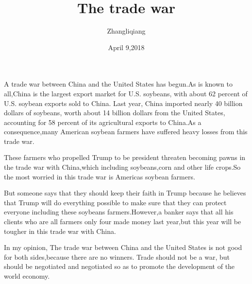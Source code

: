 \documentclass{article}
\author{Zhangliqiang}
\date{April 9,2018}
\title{The trade war}
\begin{document}
\maketitle

A trade war between China and the United States has begun.As is known to all,China is the largest export market for U.S. soybeans, with about 62 percent of U.S. soybean exports sold to China. Last year, China imported nearly 40 billion dollars of soybeans, worth about 14 billion dollars from the United States, accounting for 58 percent of its agricultural exports to China.As a consequence,many American soybean farmers have suffered heavy losses from this trade war.

These farmers who propelled Trump to be president threaten becoming pawns in the trade war with China,which including soybeans,corn and other life crops.So the most worried in this trade war is Americas soybean farmers.

But someone says that they should keep their faith in Trump because he believes that Trump will do everything possible to make sure that they can protect everyone including these soybeans farmers.However,a banker says that all his clients who are all farmers only four made money last year,but this year will be tougher in this trade war with China.

In my opinion, The trade war between China and the United States is not good for both sides,because there are no winners. Trade should not be a war, but should be negotiated and negotiated so as to promote the development of the world economy.
\end{document}
